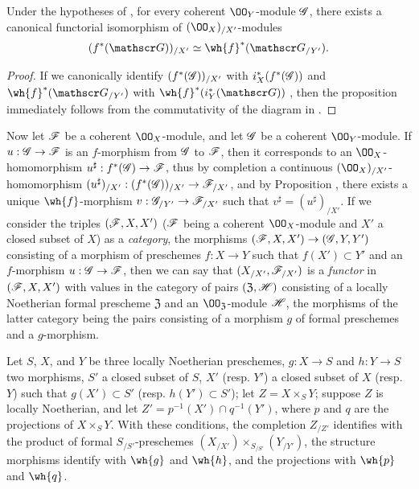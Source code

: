 \begin{prop}[10.9.5]
\label{1.10.9.5}
Under the hypotheses of , for every coherent $\OO_Y$-module $\mathscr{G}$, there exists a canonical functorial isomorphism of $(\OO_X)_{/X'}$-modules
\[
  (f^*(\sh{G}))_{/X'}\isoto\wh{f}^*(\sh{G}_{/Y'}).
\]
\end{prop}

\begin{proof}
\label{proof-1.10.9.5}
If we canonically identify $(f^*(\mathscr{G}))_{/X'}$ with $i_X^*(f^*(\mathscr{G}))$ and $\wh{f}^*(\sh{G}_{/Y'})$ with $\wh{f}^*(i_Y^*(\sh{G}))$ , then the proposition immediately follows from the commutativity of the diagram in .
\end{proof}

\begin{env}[10.9.6]
\label{1.10.9.6}
Now let $\mathscr{F}$ be a coherent $\OO_X$-module, and let $\mathscr{G}$ be a coherent $\OO_Y$-module.
If $u:\sh{G}\to\sh{F}$ is an $f$-morphism from $\mathscr{G}$ to $\mathscr{F}$, then it corresponds to an $\OO_X$-homomorphism $u^\sharp:f^*(\sh{G})\to\sh{F}$, thus by completion a continuous $(\OO_X)_{/X'}$-homomorphism $(u^\sharp)_{/X'}:(f^*(\sh{G}))_{/X'}\to\sh{F}_{/X'}$, and by Proposition , there exists a unique $\wh{f}$-morphism $v:\sh{G}_{/Y'}\to\sh{F}_{/X'}$
such that $v^\sharp=(u^\sharp)_{/X'}$.
If we consider the triples $(\mathscr{F},X,X')$ ($\mathscr{F}$ being a coherent $\OO_X$-module and $X'$ a closed subset of $X$) as a \emph{category}, the morphisms $(\sh{F},X,X')\to(\sh{G},Y,Y')$ consisting of a morphism of preschemes $f:X\to Y$ such that $f(X')\subset Y'$ and an $f$-morphism $u:\sh{G}\to\sh{F}$, then we can say that $(X_{/X'},\mathscr{F}_{/X'})$ is a \emph{functor} in $(\mathscr{F},X,X')$ with values in the category of pairs $(\mathfrak{Z},\mathscr{H})$ consisting of a locally Noetherian formal prescheme $\mathfrak{Z}$ and an $\OO_\mathfrak{Z}$-module $\mathscr{H}$, the morphisms of the latter category being the pairs consisting of a morphism $g$ of formal preschemes and a $g$-morphism.
\end{env}

\begin{prop}[10.9.7]
\label{1.10.9.7}
Let $S$, $X$, and $Y$ be three locally Noetherian preschemes, $g:X\to S$ and $h:Y\to S$ two morphisms, $S'$ a closed subset of $S$, $X'$ (resp. $Y'$) a closed subset of $X$ (resp. $Y$) such that $g(X')\subset S'$ (resp. $h(Y')\subset S'$); let $Z=X\times_S Y$; suppose $Z$ is locally Noetherian, and let $Z'=p^{-1}(X')\cap q^{-1}(Y')$, where $p$ and $q$ are the projections of $X\times_S Y$.
With these conditions, the completion $Z_{/Z'}$ identifies with the product of formal $S_{/S'}$-preschemes $(X_{/X'})\times_{S_{/S'}}(Y_{/Y'})$, the structure morphisms identify with $\wh{g}$ and $\wh{h}$, and the projections with $\wh{p}$ and $\wh{q}$.
\end{prop}

